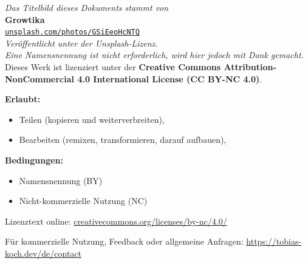 \documentclass[a4paper,10pt]{scrreport}
\title{}
\date{}
\author{}
\let\oldtexttt\texttt
\renewcommand{\texttt}[1]{{\normalsize\oldtexttt{#1}}}
\begin{document}
\maketitle
\thispagestyle{empty}
\vspace*{6cm}
\begin{center}
    \textit{Das Titelbild dieses Dokuments stammt von} \\[0.8cm]
    {\Large\textbf{Growtika}} \\[0.5cm]
    \href{https://unsplash.com/photos/GSiEeoHcNTQ}{\texttt{unsplash.com/photos/GSiEeoHcNTQ}} \\[1cm]
    \textit{Veröffentlicht unter der Unsplash-Lizenz.} \\[0.3cm]
    \textit{Eine Namensnennung ist nicht erforderlich, wird hier jedoch mit Dank gemacht.}\\
    \vspace{1cm}
    Dieses Werk ist lizenziert unter der \textbf{Creative Commons Attribution-NonCommercial 4.0 International License (CC BY-NC 4.0)}.

\vspace{0.5cm}

\textbf{Erlaubt:}
\begin{itemize}
    \item Teilen (kopieren und weiterverbreiten),
    \item Bearbeiten (remixen, transformieren, darauf aufbauen),
\end{itemize}

\textbf{Bedingungen:}
\begin{itemize}
    \item Namensnennung (BY)
    \item Nicht-kommerzielle Nutzung (NC)
\end{itemize}

\noindent
Lizenztext online: \href{https://creativecommons.org/licenses/by-nc/4.0/}{creativecommons.org/licenses/by-nc/4.0/}

\vspace{0.5cm}

\noindent
Für kommerzielle Nutzung, Feedback oder allgemeine Anfragen: \href{https://tobias-koch.dev/de/contact}{https://tobias-koch.dev/de/contact}
\end{center}

\clearpage

\setcounter{page}{1}
\tableofcontents


\end{document}

